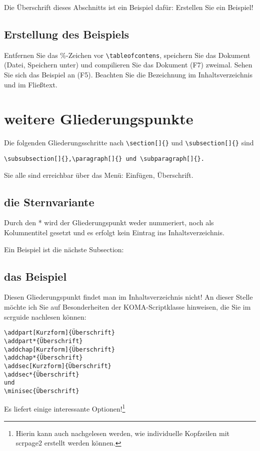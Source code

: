 \documentclass[a4paper,%
twoside,							%
headsepline = true,				%
footsepline = true,				%
headings=normal,
listof = totoc,					%
bibliography = totoc,		%
listof = entryprefix,		%
]
{scrartcl}
\begin{document}
Die Überschrift dieses Abschnitts ist ein Beispiel dafür: Erstellen Sie ein Beispiel!

\subsection{Erstellung des Beispiels}
Entfernen Sie das \%-Zeichen vor \verb#\tableofcontens#, speichern Sie das Dokument (Datei, Speichern unter) und compilieren Sie das Dokument (F7) zweimal. Sehen Sie sich das Beispiel an (F5). Beachten Sie die Bezeichnung im Inhaltsverzeichnis und im Fließtext.

\section{weitere Gliederungspunkte}
Die folgenden Gliederungsschritte nach \verb#\section[]{}# und \verb#\subsection[]{}# sind 
\begin{verbatim}
\subsubsection[]{},\paragraph[]{} und \subparagraph[]{}.
\end{verbatim}

Sie alle sind erreichbar über das Menü: Einfügen, Überschrift.

\subsection{die Sternvariante}
Durch den * wird der Gliederungspunkt weder nummeriert, noch als Kolumnentitel gesetzt und es erfolgt kein Eintrag
ins Inhaltsverzeichnis.

Ein Beispiel ist die nächste Subsection:

\subsection*{das Beispiel}
Diesen Gliederungspunkt findet man im Inhaltsverzeichnis nicht!
An dieser Stelle möchte ich Sie auf Besonderheiten der KOMA-Scriptklasse hinweisen, die Sie im scrguide nachlesen können:
\begin{verbatim}
\addpart[Kurzform]{Überschrift}
\addpart*{Überschrift}
\addchap[Kurzform]{Überschrift}
\addchap*{Überschrift}
\addsec[Kurzform]{Überschrift}
\addsec*{Überschrift}
und
\minisec{Überschrift}
\end{verbatim}
Es liefert einige interessante Optionen!\footnote{Hierin kann auch nachgelesen werden, wie individuelle Kopfzeilen mit scrpage2 erstellt werden können.}
\end{document}
